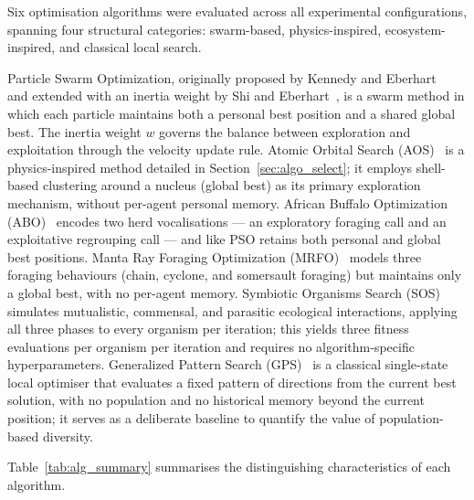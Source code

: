 \label{sec:alg_overview}

Six optimisation algorithms were evaluated across all experimental
configurations, spanning four structural categories: swarm-based,
physics-inspired, ecosystem-inspired, and classical local search.

Particle Swarm Optimization, originally proposed by Kennedy and
Eberhart~\cite{kennedy1995} and extended with an inertia weight by Shi and
Eberhart~\cite{shi1998}, is a swarm method in which each particle maintains
both a personal best position and a shared global best. The inertia weight
$w$ governs the balance between exploration and exploitation through the
velocity update rule. Atomic Orbital Search (AOS)~\cite{azizi2021} is a
physics-inspired method detailed in Section~\ref{sec:algo_select}; it employs
shell-based clustering around a nucleus (global best) as its primary
exploration mechanism, without per-agent personal memory. African Buffalo
Optimization (ABO)~\cite{odili2015} encodes two herd vocalisations --- an
exploratory foraging call and an exploitative regrouping call --- and like
PSO retains both personal and global best positions. Manta Ray Foraging
Optimization (MRFO)~\cite{zhao2020mrfo} models three foraging behaviours
(chain, cyclone, and somersault foraging) but maintains only a global best,
with no per-agent memory. Symbiotic Organisms Search (SOS)~\cite{cheng2014}
simulates mutualistic, commensal, and parasitic ecological interactions,
applying all three phases to every organism per iteration; this yields three
fitness evaluations per organism per iteration and requires no
algorithm-specific hyperparameters. Generalized Pattern Search
(GPS)~\cite{torczon1997} is a classical single-state local optimiser that
evaluates a fixed pattern of directions from the current best solution, with
no population and no historical memory beyond the current position; it serves
as a deliberate baseline to quantify the value of population-based diversity.

Table~\ref{tab:alg_summary} summarises the distinguishing characteristics of
each algorithm.

